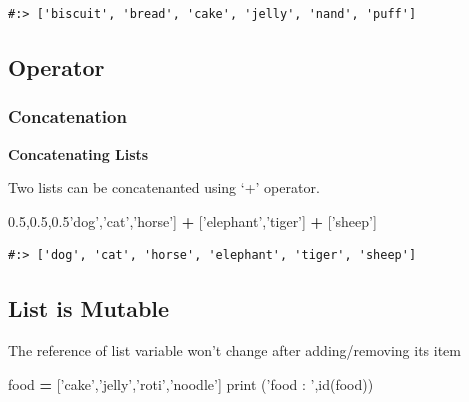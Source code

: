 \documentclass[
]{book}
\newenvironment{Shaded}{\begin{snugshade}}{\end{snugshade}}
\newcommand{\BuiltInTok}[1]{#1}
\newcommand{\NormalTok}[1]{#1}
\newcommand{\OperatorTok}[1]{\textcolor[rgb]{0.43,0.43,0.43}{\textbf{#1}}}
\newcommand{\StringTok}[1]{\textcolor[rgb]{0.5,0.5,0.5}{#1}}
\begin{document}
\begin{verbatim}
#:> ['biscuit', 'bread', 'cake', 'jelly', 'nand', 'puff']
\end{verbatim}

\hypertarget{operator-1}{%
\subsection{Operator}\label{operator-1}}

\hypertarget{concatenation-1}{%
\subsubsection{Concatenation}\label{concatenation-1}}

\textbf{Concatenating Lists}

Two lists can be concatenanted using `+' operator.

\begin{Shaded}
\begin{Highlighting}[]
\NormalTok{[}\StringTok{'dog'}\NormalTok{,}\StringTok{'cat'}\NormalTok{,}\StringTok{'horse'}\NormalTok{] }\OperatorTok{+}\NormalTok{ [}\StringTok{'elephant'}\NormalTok{,}\StringTok{'tiger'}\NormalTok{] }\OperatorTok{+}\NormalTok{ [}\StringTok{'sheep'}\NormalTok{]}
\end{Highlighting}
\end{Shaded}

\begin{verbatim}
#:> ['dog', 'cat', 'horse', 'elephant', 'tiger', 'sheep']
\end{verbatim}

\hypertarget{list-is-mutable}{%
\subsection{List is Mutable}\label{list-is-mutable}}

The reference of list variable won't change after adding/removing its item

\begin{Shaded}
\begin{Highlighting}[]
\NormalTok{food }\OperatorTok{=}\NormalTok{ [}\StringTok{'cake'}\NormalTok{,}\StringTok{'jelly'}\NormalTok{,}\StringTok{'roti'}\NormalTok{,}\StringTok{'noodle'}\NormalTok{]}
\BuiltInTok{print}\NormalTok{ (}\StringTok{'food : '}\NormalTok{,}\BuiltInTok{id}\NormalTok{(food))}
\end{Highlighting}
\end{Shaded}
\end{document}
